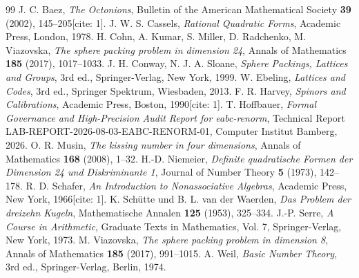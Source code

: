 \documentclass[11pt,a4paper]{article}
\begin{document}
	\begin{thebibliography}{99}
		 J. C. Baez, \emph{The Octonions}, Bulletin of the American Mathematical Society \textbf{39} (2002), 145--205[cite: 1].
		 J. W. S. Cassels, \emph{Rational Quadratic Forms}, Academic Press, London, 1978.
		 H. Cohn, A. Kumar, S. Miller, D. Radchenko, M. Viazovska, \emph{The sphere packing problem in dimension 24}, Annals of Mathematics \textbf{185} (2017), 1017--1033.
		 J. H. Conway, N. J. A. Sloane, \emph{Sphere Packings, Lattices and Groups}, 3rd ed., Springer-Verlag, New York, 1999.
		 W. Ebeling, \emph{Lattices and Codes}, 3rd ed., Springer Spektrum, Wiesbaden, 2013.
		 F. R. Harvey, \emph{Spinors and Calibrations}, Academic Press, Boston, 1990[cite: 1].
		 T. Hoffbauer, \emph{Formal Governance and High-Precision Audit Report for eabc-renorm}, Technical Report LAB-REPORT-2026-08-03-EABC-RENORM-01, Computer Institut Bamberg, 2026.
		 O. R. Musin, \emph{The kissing number in four dimensions}, Annals of Mathematics \textbf{168} (2008), 1--32.
		 H.-D. Niemeier, \emph{Definite quadratische Formen der Dimension 24 und Diskriminante 1}, Journal of Number Theory \textbf{5} (1973), 142--178.
		 R. D. Schafer, \emph{An Introduction to Nonassociative Algebras}, Academic Press, New York, 1966[cite: 1].
		 K. Schütte und B. L. van der Waerden, \emph{Das Problem der dreizehn Kugeln}, Mathematische Annalen \textbf{125} (1953), 325--334.
		 J.-P. Serre, \emph{A Course in Arithmetic}, Graduate Texts in Mathematics, Vol. 7, Springer-Verlag, New York, 1973.
		 M. Viazovska, \emph{The sphere packing problem in dimension 8}, Annals of Mathematics \textbf{185} (2017), 991--1015.
		 A. Weil, \emph{Basic Number Theory}, 3rd ed., Springer-Verlag, Berlin, 1974.
	\end{thebibliography}
	
\end{document}
